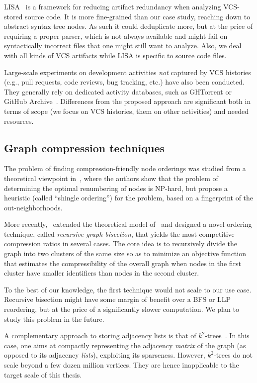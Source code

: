 LISA~\cite{alexandru2019redundancy} is a framework for reducing artifact
redundancy when analyzing VCS-stored source code. It is more fine-grained than
our case study, reaching down to abstract syntax tree nodes. As such it could
deduplicate more, but at the price of requiring a proper parser, which is not
always available and might fail on syntactically incorrect files that one might
still want to analyze. Also, we deal with all kinds of VCS artifacts while LISA
is specific to source code files.

Large-scale experiments on development activities \emph{not} captured by VCS
histories (e.g., pull requests, code reviews, bug tracking, etc.) have also
been conducted. They generally rely on dedicated activity databases, such as
GHTorrent or GitHub Archive~\cite{GHTorrent, ray2014large}. Differences from
the proposed approach are significant both in terms of scope (we focus on VCS
histories, them on other activities) and needed resources.


\subsection{Graph compression techniques}%
\label{sec:graph-compression-techniques}

The problem of finding compression-friendly node orderings was studied from a
theoretical viewpoint in~\cite{CKLCSN}, where the authors show that the problem
of determining the optimal renumbering of nodes is NP-hard, but propose a
heuristic (called ``shingle ordering'') for the problem, based on a fingerprint
of the out-neighborhoods.

More recently,~\cite{DKKCGIRGB} extended the theoretical model of~\cite{CKLCSN}
and designed a novel ordering technique, called \emph{recursive graph
bisection}, that yields the most competitive compression ratios in several
cases. The core idea is to recursively divide the graph into two clusters of
the same size so as to minimize an objective function that estimates the
compressibility of the overall graph when nodes in the first cluster have
smaller identifiers than nodes in the second cluster.

To the best of our knowledge, the first technique would not scale to our use
case. Recursive bisection might have some margin of benefit over a BFS or LLP
reordering, but at the price of a significantly slower computation. We plan to
study this problem in the future.

A complementary approach to storing adjacency lists is that of
$k^2$-trees~\cite{Brisaboa2014152}. In this case, one aims at compactly
representing the adjacency \emph{matrix} of the graph (as opposed to its
adjacency \emph{lists}), exploiting its sparseness.  However, $k^2$-trees do
not scale beyond a few dozen million vertices. They are hence inapplicable to
the target scale of this thesis.

